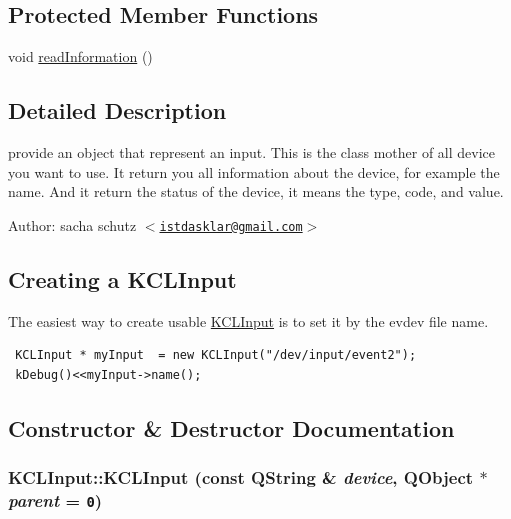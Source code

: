\subsection*{Protected Member Functions}
\begin{CompactItemize}
\item 
void \hyperlink{class_k_c_l_input_33e1fd26c084040a728cabf03e445893}{readInformation} ()
\end{CompactItemize}


\subsection{Detailed Description}
provide an object that represent an input. This is the class mother of all device you want to use. It return you all information about the device, for example the name. And it return the status of the device, it means the type, code, and value. 

\begin{Desc}
\item[Author:]sacha schutz $<$\href{mailto:istdasklar@gmail.com}{\tt istdasklar@gmail.com}$>$\end{Desc}
\hypertarget{class_k_c_l_input_creating}{}\subsection{Creating a KCLInput}\label{class_k_c_l_input_creating}
The easiest way to create usable \hyperlink{class_k_c_l_input}{KCLInput} is to set it by the evdev file name. 

\begin{Code}\begin{verbatim} KCLInput * myInput  = new KCLInput("/dev/input/event2");
 kDebug()<<myInput->name();
\end{verbatim}
\end{Code}

 

\subsection{Constructor \& Destructor Documentation}
\hypertarget{class_k_c_l_input_8be2188910f86e335d36694068eab677}{
\subsubsection[{KCLInput}]{\setlength{\rightskip}{0pt plus 5cm}KCLInput::KCLInput (const QString \& {\em device}, \/  QObject $\ast$ {\em parent} = {\tt 0})}}
\label{class_k_c_l_input_8be2188910f86e335d36694068eab677}


